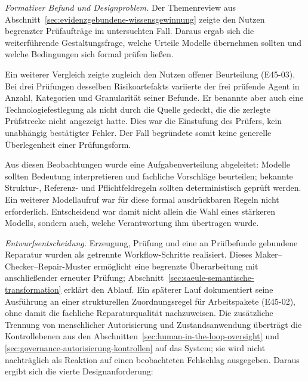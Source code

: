 \emph{Formativer Befund und Designproblem.} Der Themenreview aus
Abschnitt~\ref{sec:evidenzgebundene-wissensgewinnung} zeigte den
Nutzen begrenzter Prüfaufträge im untersuchten Fall. Daraus ergab
sich die weiterführende Gestaltungsfrage, welche Urteile Modelle
übernehmen sollten und welche Bedingungen sich formal prüfen ließen.

Ein weiterer Vergleich zeigte zugleich den Nutzen offener
Beurteilung (E45-03). Bei drei Prüfungen desselben Risikoartefakts
variierte der frei prüfende Agent in Anzahl, Kategorien und
Granularität seiner Befunde. Er benannte aber auch eine
Technologiefestlegung als nicht durch die Quelle gedeckt, die die
zerlegte Prüfstrecke nicht angezeigt hatte. Dies war die Einstufung
des Prüfers, kein unabhängig bestätigter Fehler. Der Fall begründete
somit keine generelle Überlegenheit einer Prüfungsform.

Aus diesen Beobachtungen wurde eine Aufgabenverteilung abgeleitet:
Modelle sollten Bedeutung interpretieren und fachliche Vorschläge
beurteilen; bekannte Struktur-, Referenz- und Pflichtfeldregeln
sollten deterministisch geprüft werden. Ein weiterer Modellaufruf
war für diese formal ausdrückbaren Regeln nicht erforderlich.
Entscheidend war damit nicht allein die Wahl eines stärkeren
Modells, sondern auch, welche Verantwortung ihm übertragen wurde.

\emph{Entwurfsentscheidung.} Erzeugung, Prüfung und eine an
Prüfbefunde gebundene Reparatur wurden als getrennte Workflow-Schritte
realisiert. Dieses Maker--Checker--Repair-Muster ermöglicht eine
begrenzte Überarbeitung mit anschließender erneuter Prüfung;
Abschnitt~\ref{sec:saeule-semantische-transformation} erklärt den
Ablauf. Ein späterer Lauf dokumentiert seine Ausführung an einer
strukturellen Zuordnungsregel für Arbeitspakete (E45-02), ohne damit
die fachliche Reparaturqualität nachzuweisen. Die zusätzliche
Trennung von menschlicher Autorisierung und Zustandsanwendung
überträgt die Kontrollebenen aus den
Abschnitten~\ref{sec:human-in-the-loop-oversight} und
\ref{sec:governance-autorisierung-kontrollen} auf das System; sie
wird nicht nachträglich als Reaktion auf einen beobachteten
Fehlschlag ausgegeben. Daraus ergibt sich die vierte
Designanforderung:

